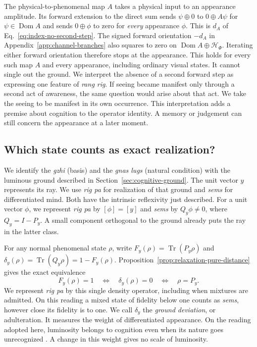 \documentclass[11pt]{article}
\theoremstyle{definition}
\DeclareMathOperator{\Tr}{Tr}
\begin{document}
The physical-to-phenomenal map $A$ takes a physical input to an appearance amplitude. Its forward extension to the direct sum sends $\psi\oplus0$ to $0\oplus A\psi$ for $\psi\in\operatorname{Dom}A$ and sends $0\oplus\phi$ to zero for \emph{every} appearance $\phi$. This is $d_A$ of Eq.~\eqref{eq:index-no-second-step}. The signed forward orientation $-d_A$ in Appendix~\ref{app:channel-branches} also squares to zero on $\operatorname{Dom}A\oplus\mathcal H_\Phi$. Iterating either forward orientation therefore stops at the appearance. This holds for every such map $A$ and every appearance, including ordinary visual states. It cannot single out the ground. We interpret the absence of a second forward step as expressing one feature of \emph{rang rig}. If seeing became manifest only through a second act of awareness, the same question would arise about that act. We take the seeing to be manifest in its own occurrence. This interpretation adds a premise about cognition to the operator identity. A memory or judgement can still concern the appearance at a later moment.

\subsection{Which state counts as exact realization?}
\label{subsec:realization-ground}

We identify the \emph{gzhi} (basis) and the \emph{gnas lugs} (natural condition) with the luminous ground described in Section~\ref{sec:cognitive-ground}. The unit vector $y$ represents its ray. We use \emph{rig pa} for realization of that ground and \emph{sems} for differentiated mind. Both have the intrinsic reflexivity just described. For a unit vector $\phi$, we represent \emph{rig pa} by $[\phi]=[y]$ and \emph{sems} by $Q_y\phi\ne0$, where $Q_y=I-P_y$. A small component orthogonal to the ground already puts the ray in the latter class.

For any normal phenomenal state $\rho$, write $F_y(\rho)=\Tr(P_y\rho)$ and $\delta_y(\rho)=\Tr(Q_y\rho)=1-F_y(\rho)$. Proposition~\ref{prop:relaxation-pure-distance} gives the exact equivalence
\[
 F_y(\rho)=1 \quad\Longleftrightarrow\quad \delta_y(\rho)=0
 \quad\Longleftrightarrow\quad \rho=P_y .
\]
We represent \emph{rig pa} by this single density operator, including when mixtures are admitted. On this reading a mixed state of fidelity below one counts as \emph{sems}, however close its fidelity is to one. We call $\delta_y$ the \emph{ground deviation}, or adulteration. It measures the weight of differentiated appearance. On the reading adopted here, luminosity belongs to cognition even when its nature goes unrecognized \cite[pp.~162--163]{Yiannopoulos2012}. A change in this weight gives no scale of luminosity.
\end{document}
